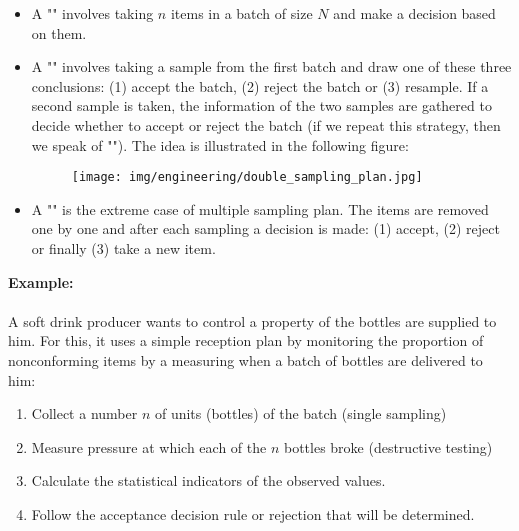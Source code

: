	\begin{itemize}
		\item A "" involves taking $n$ items in a batch of size $N$ and make a decision based on them.

		\item A "" involves taking a sample from the first batch and draw one of these three conclusions: (1) accept the batch, (2) reject the batch or (3) resample. If a second sample is taken, the information of the two samples are gathered to decide whether to accept or reject the batch (if we repeat this strategy, then we speak of ""). The idea is illustrated in the following figure:
		\begin{figure}[H]
			\begin{center}
			\texttt{[image: img/engineering/double\_sampling\_plan.jpg]}
			\end{center}	
		\end{figure}
		\item A "" is the extreme case of multiple sampling plan. The items are removed one by one and after each sampling a decision is made: (1) accept, (2) reject or finally (3) take a new item.
	\end{itemize}
	\begin{tcolorbox}[colframe=black,colback=white,sharp corners]
	\textbf{{\Large {}}Example:}\\\\
	A soft drink producer wants to control a property of the bottles are supplied to him. For this, it uses a simple reception plan by monitoring the proportion of nonconforming items by a measuring when a batch of bottles are delivered to him:

	\begin{enumerate}
		\item Collect a number $n$ of units (bottles) of the batch (single sampling)

		\item Measure pressure at which each of the $n$ bottles broke (destructive testing)

		\item Calculate the statistical indicators of the observed values.

		\item Follow the acceptance decision rule or rejection that will be determined.
	\end{enumerate}
	\end{tcolorbox}
